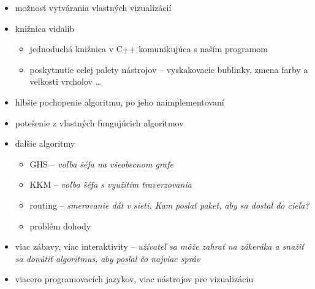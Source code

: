 
\begin{itemize}

    \item možnosť vytvárania vlastných vizualizácií
    \item knižnica vidalib
        \begin{itemize}
            \item jednoduchá knižnica v C++ komunikujúca s naším programom
            \item poskytnutie celej palety nástrojov -- vyskakovacie bublinky, zmena farby a
            veľkosti vrcholov \dots
        \end{itemize}
    \item hlbšie pochopenie algoritmu, po jeho naimplementovaní
    \item potešenie z vlastných fungujúcich algoritmov

\end{itemize}




\begin{itemize}
    \item ďalšie algoritmy
    \begin{itemize}
        \item GHS -- \emph{voľba šéfa na všeobecnom grafe}
        \item KKM -- \emph{voľba šéfa s využitím traverzovania}
        \item routing -- \emph{smerovanie dát v sieti. Kam poslať paket, aby sa dostal do cieľa?}
        \item problém dohody
    \end{itemize}
    \item viac zábavy, viac interaktivity -- \emph{užívateľ sa môže zahrať na zákeráka a snažiť sa
    donútiť algoritmus, aby poslal čo najviac správ}
    \item viacero programovacích jazykov, viac nástrojov pre vizualizáciu
\end{itemize}

